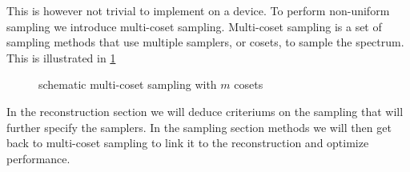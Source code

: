 \documentclass[a4paper, openany, oneside]{memoir}
\begin{document}
This is however not trivial to implement on a device. To perform non-uniform sampling we introduce multi-coset sampling. Multi-coset sampling is a set of sampling methods that use multiple samplers, or cosets, to sample the spectrum. This is illustrated in \cref{tkz:multicoset}

\begin{figure}[H]
\centering
{}
\caption{schematic multi-coset sampling with $m$ cosets}\label{tkz:multicoset}
\end{figure}

In the reconstruction section we will deduce criteriums on the sampling that will further specify the samplers. In the sampling section methods we will then get back to multi-coset sampling to link it to the reconstruction and optimize performance.
\end{document}
